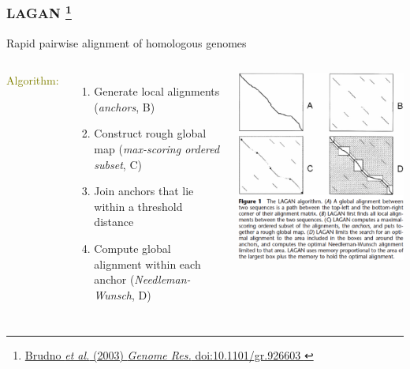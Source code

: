 %
\begin{frame}
  \frametitle{LAGAN
  \footnote{\tiny{\href{http://dx.doi.org/10.1101/gr.926603
}{Brudno \textit{et al.} (2003) \textit{Genome Res.} doi:10.1101/gr.926603
}}}
  }
  Rapid pairwise alignment of homologous genomes
  \begin{columns}[T] 
      \textcolor{olive}{Algorithm:}
      \begin{enumerate}
        \item \textcolor{hutton_green}{Generate local alignments {\small(\textit{anchors}, B)}}
        \item \textcolor{hutton_blue}{Construct rough global map {\small(\textit{max-scoring ordered subset}, C)}}
        \item Join anchors that lie within a threshold distance
        \item \textcolor{hutton_purple}{Compute global alignment within each anchor {\small(\textit{Needleman-Wunsch}, D)}}
      \end{enumerate}
      \includegraphics[width=\textwidth]{images/lagan_method}
  \end{columns}    
\end{frame}

